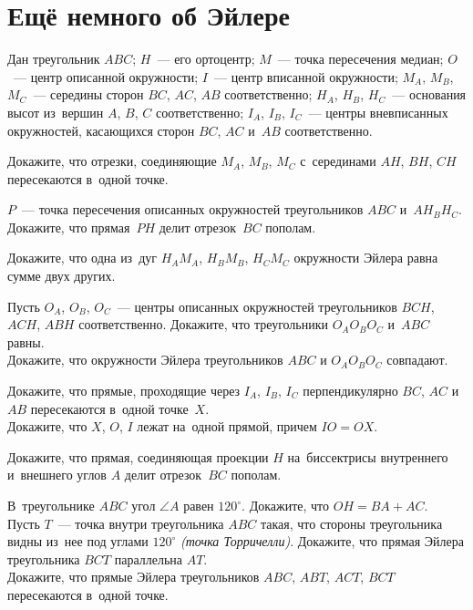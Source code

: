 
\section*{Ещё немного об Эйлере}


Дан треугольник $ABC$;
$H$~--- его ортоцентр;
$M$~--- точка пересечения медиан;
$O$~--- центр описанной окружности;
$I$~--- центр вписанной окружности;
$M_A$, $M_B$, $M_C$~--- середины сторон $BC$, $AC$, $AB$ соответственно;
$H_A$, $H_B$, $H_C$~--- основания высот из~вершин $A$, $B$, $C$ соответственно;
$I_A$, $I_B$, $I_C$~--- центры вневписанных окружностей, касающихся сторон
$BC$, $AC$ и~$AB$ соответственно.

\begin{problems}

\item
Докажите, что отрезки, соединяющие $M_A$, $M_B$, $M_C$ с~серединами
$AH$, $BH$, $CH$ пересекаются в~одной точке.

\item
$P$~--- точка пересечения описанных окружностей треугольников $ABC$
и~$A H_B H_C$.
Докажите, что прямая~$PH$ делит отрезок~$BC$ пополам.

\item
Докажите, что одна из~дуг $H_A M_A$, $H_B M_B$, $H_C M_C$ окружности Эйлера
равна сумме двух других.

\item
\sp
Пусть $O_A$, $O_B$, $O_C$~--- центры описанных окружностей треугольников
$BCH$, $ACH$, $ABH$ соответственно.
Докажите, что треугольники $O_A O_B O_C$ и~$ABC$ равны.
\\
\sp
Докажите, что окружности Эйлера треугольников $ABC$ и $O_A O_B O_C$ совпадают.

\item
\sp
Докажите, что прямые, проходящие через $I_A$, $I_B$, $I_C$ перпендикулярно
$BC$, $AC$ и~$AB$ пересекаются в~одной точке~$X$.
\\
\sp
Докажите, что $X$, $O$, $I$ лежат на~одной прямой, причем $IO = OX$.

\item
Докажите, что прямая, соединяющая проекции $H$ на~биссектрисы внутреннего
и~внешнего углов $A$ делит отрезок~$BC$ пополам.

\item
\sp
В~треугольнике $ABC$ угол $\angle A$ равен $120^{\circ}$.
Докажите, что $OH = BA + AC$.
\\
\sp
Пусть $T$~--- точка внутри треугольника $ABC$ такая, что стороны треугольника
видны из~нее под углами $120^{\circ}$ \emph{(точка Торричелли)}.
Докажите, что прямая Эйлера треугольника $BCT$ параллельна $AT$.
\\
\sp
Докажите, что прямые Эйлера треугольников $ABC$, $ABT$, $ACT$, $BCT$
пересекаются в~одной точке.

\end{problems}

